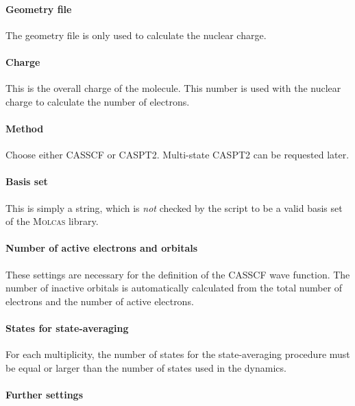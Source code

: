 \documentclass[a4paper,10pt,DIV=15,openany]{scrbook}
\begin{document}
\paragraph{Geometry file}

The geometry file is only used to calculate the nuclear charge.

\paragraph{Charge}

This is the overall charge of the molecule. This number is used with the nuclear charge to calculate the number of electrons.

\paragraph{Method}

Choose either CASSCF or CASPT2. Multi-state CASPT2 can be requested later.

\paragraph{Basis set}

This is simply a string, which is \textit{not} checked by the script to be a valid basis set of the \textsc{Molcas} library.

\paragraph{Number of active electrons and orbitals}

These settings are necessary for the definition of the CASSCF wave function. The number of inactive orbitals is automatically calculated from the total number of electrons and the number of active electrons.

\paragraph{States for state-averaging}

For each multiplicity, the number of states for the state-averaging procedure must be equal or larger than the number of states used in the dynamics.

\paragraph{Further settings}
\end{document}
